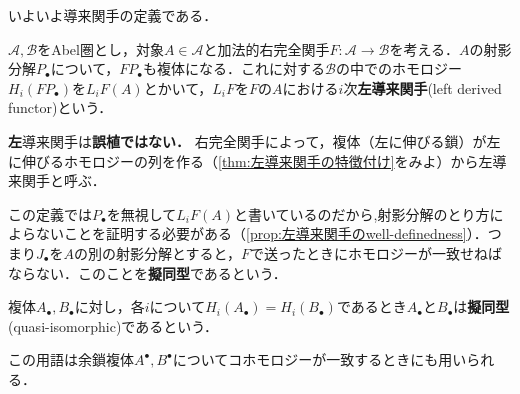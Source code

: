 いよいよ導来関手の定義である．
\begin{defi}[左導来関手]
	$\mathscr{A,B}$をAbel圏とし，対象$A\in\mathscr{A}$と加法的右完全関手$F:\mathscr{A}\to\mathscr{B}$を考える．$A$の射影分解$P_\bullet$について，$F P_\bullet$も複体になる．これに対する$\mathscr{B}$の中でのホモロジー$H_i(F P_\bullet)$を$L_i F (A)$とかいて，$L_iF$を$F$の$A$における$i$次\textbf{左導来関手}(left derived functor)という．
\end{defi}

\textbf{左}導来関手は\textbf{誤植ではない．} 右完全関手によって，複体（左に伸びる鎖）が左に伸びるホモロジーの列を作る（\ref{thm:左導来関手の特徴付け}をみよ）から左導来関手と呼ぶ．

この定義では$P_\bullet$を無視して$L_i F(A)$と書いているのだから,射影分解のとり方によらないことを証明する必要がある（\ref{prop:左導来関手のwell-definedness}）．つまり$J_\bullet$を$A$の別の射影分解とすると，$F$で送ったときにホモロジーが一致せねばならない．このことを\textbf{擬同型}であるという．

\begin{defi}[擬同型]
	複体$A_\bullet,B_\bullet$に対し，各$i$について$H_i(A_\bullet)=H_i(B_\bullet)$であるとき$A_\bullet$と$B_\bullet$は\textbf{擬同型}(quasi-isomorphic)であるという．
\end{defi}

この用語は余鎖複体$A^\bullet,B^\bullet$についてコホモロジーが一致するときにも用いられる．

